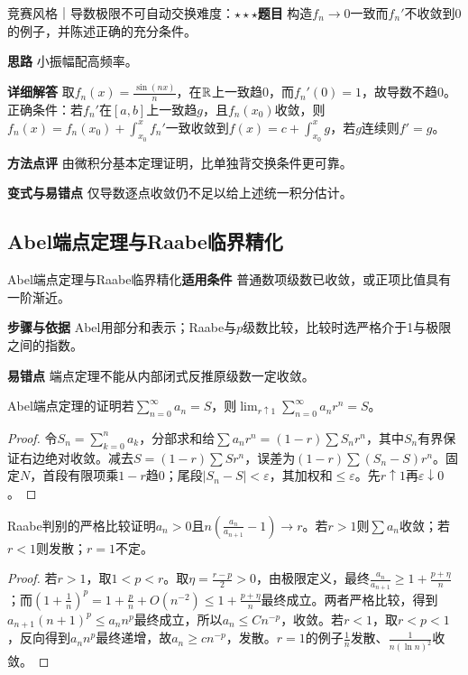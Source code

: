 \begin{example}{竞赛风格｜导数极限不可自动交换}{难度：$\star\star\star$}\label{deep:ex:series_source_deep:derivative}\textbf{题目} 构造$f_n\to0$一致而$f_n'$不收敛到0的例子，并陈述正确的充分条件。\par\textbf{思路} 小振幅配高频率。\par\textbf{详细解答} 取$f_n(x)=\frac{\sin(nx)}{n}$，在$\mathbb{R}$上一致趋0，而$f_n'(0)=1$，故导数不趋0。正确条件：若$f_n'$在$[a,b]$上一致趋$g$，且$f_n(x_0)$收敛，则$f_n(x)=f_n(x_0)+\int_{x_0}^xf_n'$一致收敛到$f(x)=c+\int_{x_0}^xg$，若$g$连续则$f'=g$。\par\textbf{方法点评} 由微积分基本定理证明，比单独背交换条件更可靠。\par\textbf{变式与易错点} 仅导数逐点收敛仍不足以给上述统一积分估计。\end{example}

\subsection{Abel端点定理与Raabe临界精化}\label{deep:series_source_deep:abelproof}

\begin{method}{Abel端点定理与Raabe临界精化}\textbf{适用条件} 普通数项级数已收敛，或正项比值具有一阶渐近。\par\textbf{步骤与依据} Abel用部分和表示；Raabe与$p$级数比较，比较时选严格介于1与极限之间的指数。\par\textbf{易错点} 端点定理不能从内部闭式反推原级数一定收敛。\end{method}

\begin{theorem}{Abel端点定理的证明}若$\sum_{n=0}^\infty a_n=S$，则$\lim_{r\uparrow1}\sum_{n=0}^\infty a_nr^n=S$。\end{theorem}\begin{proof}令$S_n=\sum_{k=0}^na_k$，分部求和给$\sum a_nr^n=(1-r)\sum S_nr^n$，其中$S_n$有界保证右边绝对收敛。减去$S=(1-r)\sum Sr^n$，误差为$(1-r)\sum(S_n-S)r^n$。固定$N$，首段有限项乘$1-r$趋0；尾段$|S_n-S|<\varepsilon$，其加权和$\le\varepsilon$。先$r\uparrow1$再$\varepsilon\downarrow0$。\end{proof}

\begin{theorem}{Raabe判别的严格比较证明}$a_n>0$且$n(\frac{a_n}{a_{n+1}}-1)\to r$。若$r>1$则$\sum a_n$收敛；若$r<1$则发散；$r=1$不定。\end{theorem}\begin{proof}若$r>1$，取$1<p<r$。取$\eta=\frac{r-p}{2}>0$，由极限定义，最终$\frac{a_n}{a_{n+1}}\ge1+\frac{p+\eta}{n}$；而$(1+\frac{1}{n})^p=1+\frac{p}{n}+O(n^{-2})\le1+\frac{p+\eta}{n}$最终成立。两者严格比较，得到$a_{n+1}(n+1)^p\le a_nn^p$最终成立，所以$a_n\le Cn^{-p}$，收敛。若$r<1$，取$r<p<1$，反向得到$a_nn^p$最终递增，故$a_n\ge cn^{-p}$，发散。$r=1$的例子$\frac{1}{n}$发散、$\frac{1}{n(\ln n)^2}$收敛。\end{proof}

